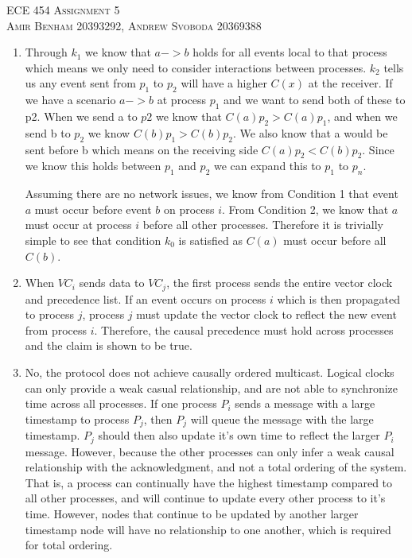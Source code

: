 \documentclass{article}
\begin{document}
\begin{center}
\textsc{\Large ECE 454 Assignment 5}\\[0.5cm]
\textsc{Amir Benham 20393292, Andrew Svoboda 20369388}\\[0.5cm]
\end{center}

\begin{enumerate}

	\item  

Through \(k_1\) we know that  \(a -> b\) holds for all events local to that process which means we only need to consider interactions between processes. \(k_2\) tells us any event sent from \(p_1\) to \(p_2\) will have a higher \(C(x)\) at the receiver. If we have a scenario \(a -> b\) at process \(p_1\) and we want to send both of these to p2. When we send a to \(p2\) we know that \(C(a) p_2 > C(a) p_1\), and when we send b to \(p_2\) we know \(C(b) p_1 > C(b) p_2\).  We also know that a would be sent before b which means on the receiving side \(C(a) p_2 < C(b) p_2\). Since we know this holds between \(p_1\) and \(p_2\) we can expand this to \(p_1\) to \(p_n\).

Assuming there are no network issues, we know from Condition 1 that event \(a\) must occur before event \(b\) on process \(i\). From Condition 2, we know that \(a\) must occur at process \(i\) before all other processes. Therefore it is trivially simple to see that condition \(k_0\) is satisfied as \(C(a)\) must occur before all \(C(b)\).

	\item

When \(VC_i\) sends data to \(VC_j\), the first process sends the entire vector clock and precedence list. If an event occurs on process \(i\) which is then propagated to process \(j\), process \(j\) must update the vector clock to reflect the new event from process \(i\). Therefore, the causal precedence must hold across processes and the claim is shown to be true. 

	\item

No, the protocol does not achieve causally ordered multicast. Logical clocks can only provide a weak casual relationship, and are not able to synchronize time across all processes. If one process \(P_i\) sends a message with a large timestamp to process \(P_j\), then \(P_j\) will queue the message with the large timestamp. \(P_j\) should then also update it's own time to reflect the larger \(P_i\) message. However, because the other processes can only infer a weak causal relationship with the acknowledgment, and not a total ordering of the system. That is, a process can continually have the highest timestamp compared to all other processes, and will continue to update every other process to it's time. However, nodes that continue to be updated by another larger timestamp node will have no relationship to one another, which is required for total ordering.


\end{enumerate}
\end{document}
